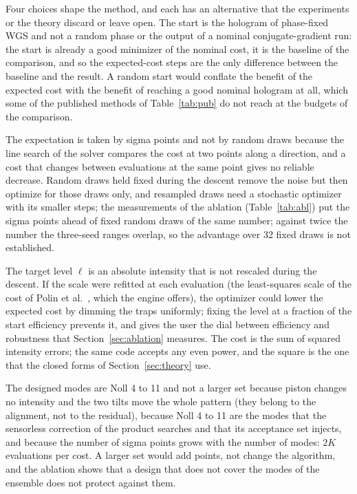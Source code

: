 Four choices shape the method, and each has an alternative that the experiments or the theory discard or leave open. The start is the hologram of phase-fixed WGS and not a random phase or the output of a nominal conjugate-gradient run: the start is already a good minimizer of the nominal cost, it is the baseline of the comparison, and so the expected-cost steps are the only difference between the baseline and the result. A random start would
conflate the benefit of the expected cost with the benefit of reaching a good nominal hologram at all, which some of the published methods of Table~\ref{tab:pub} do not reach at the budgets of the comparison.

The expectation is taken by sigma points and not by random draws because the line search of the solver compares the cost at two points along a direction, and a cost that changes between evaluations at the same point gives no reliable decrease. Random draws held fixed during the descent remove the noise but then optimize for those draws only, and resampled draws need a stochastic optimizer with its smaller steps; the measurements of the ablation (Table~\ref{tab:abl}) put the sigma points ahead of fixed random draws of the same number; against twice the number the three-seed ranges overlap, so the advantage over 32 fixed draws is not established.

The target level $\ell$ is an absolute intensity that is not rescaled during the descent. If the scale were refitted at each evaluation (the least-squares scale of the cost of Polin et al.~\cite{polin2005}, which the engine offers), the optimizer could lower the expected cost by dimming the traps uniformly; fixing the level at a fraction of the start efficiency prevents it, and gives the user the dial between efficiency and robustness that Section~\ref{sec:ablation} measures. The cost is the sum of squared intensity errors; the same code accepts any even power, and the square is the one that the closed forms of Section~\ref{sec:theory} use.

The designed modes are Noll 4 to 11 and not a larger set because piston changes no intensity and the two tilts move the whole pattern (they belong to the alignment, not to the residual), because Noll 4 to 11 are the modes that the sensorless correction of the product searches and that its acceptance set injects, and because the number of sigma points grows with the number of modes: $2K$ evaluations per cost. A larger set would add points, not change the algorithm, and the ablation shows that a design that does not cover the modes of the ensemble does not protect against them.

